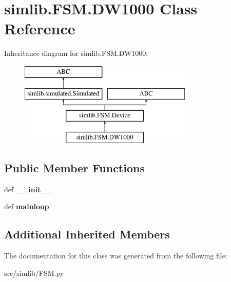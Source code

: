 \hypertarget{classsimlib_1_1_f_s_m_1_1_d_w1000}{}\section{simlib.\+F\+S\+M.\+D\+W1000 Class Reference}
\label{classsimlib_1_1_f_s_m_1_1_d_w1000}
Inheritance diagram for simlib.\+F\+S\+M.\+D\+W1000\+:\begin{figure}[H]
\begin{center}
\leavevmode
\includegraphics[height=4.000000cm]{classsimlib_1_1_f_s_m_1_1_d_w1000}
\end{center}
\end{figure}
\subsection*{Public Member Functions}
\begin{DoxyCompactItemize}
\item 
\mbox{\label{classsimlib_1_1_f_s_m_1_1_d_w1000_a0c91896ce1517bade299a3a905b3c26c}} 
def {\bfseries \+\_\+\+\_\+init\+\_\+\+\_\+}
\item 
\mbox{\label{classsimlib_1_1_f_s_m_1_1_d_w1000_aa91a241f59daa1f2479f0d19f60c6124}} 
def {\bfseries mainloop}
\end{DoxyCompactItemize}
\subsection*{Additional Inherited Members}


The documentation for this class was generated from the following file\+:\begin{DoxyCompactItemize}
\item 
src/simlib/F\+S\+M.\+py\end{DoxyCompactItemize}
